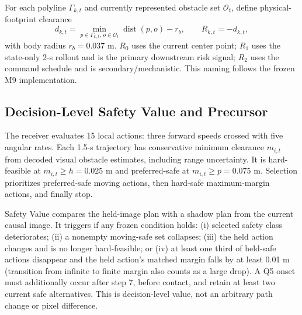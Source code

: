 \documentclass[letterpaper,10pt,conference]{ieeeconf}
\begin{document}
For each polyline $\Gamma_{k,t}$ and currently represented obstacle set
$\mathcal O_t$, define physical-footprint clearance
\begin{equation}
d_{k,t}=\min_{p\in\Gamma_{k,t},\,o\in\mathcal O_t}
\operatorname{dist}(p,o)-r_b, \qquad R_{k,t}=-d_{k,t},
\label{eq:risk}
\end{equation}
with body radius $r_b=0.037$ m. $R_0$ uses the current center point;
$R_1$ uses the state-only 2-s rollout and is the primary downstream risk
signal; $R_2$ uses the command schedule and is secondary/mechanistic. This
naming follows the frozen M9 implementation.

\subsection{Decision-Level Safety Value and Precursor}
The receiver evaluates 15 local actions: three forward speeds crossed with
five angular rates. Each 1.5-s trajectory has conservative minimum clearance
$m_{i,t}$ from decoded visual obstacle estimates, including range uncertainty.
It is hard-feasible at $m_{i,t}\geq h=0.025$ m and preferred-safe at
$m_{i,t}\geq p=0.075$ m. Selection prioritizes preferred-safe moving actions,
then hard-safe maximum-margin actions, and finally stop.

Safety Value compares the held-image plan with a shadow plan from the current
causal image. It triggers if any frozen condition holds: (i) selected safety
class deteriorates; (ii) a nonempty moving-safe set collapses; (iii) the held
action changes and is no longer hard-feasible; or (iv) at least one third of
held-safe actions disappear and the held action's matched margin falls by at
least 0.01 m (transition from infinite to finite margin also counts as a large
drop). A Q5 onset must additionally occur after step 7, before contact, and
retain at least two current safe alternatives. This is decision-level value,
not an arbitrary path change or pixel difference.
\end{document}
